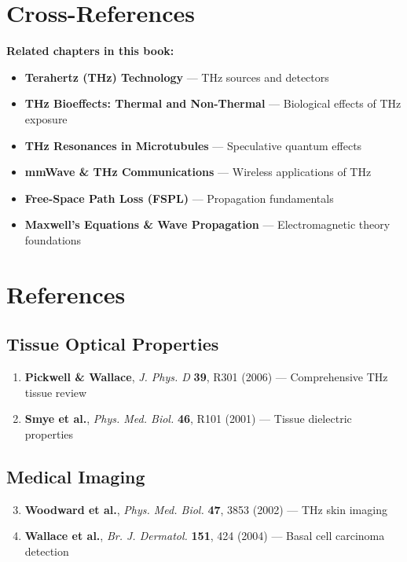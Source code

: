 \section{Cross-References}
\label{sec:cross-references}

\textbf{Related chapters in this book:}
\begin{itemize}
\item \textbf{Terahertz (THz) Technology} --- THz sources and detectors
\item \textbf{THz Bioeffects: Thermal and Non-Thermal} --- Biological effects of THz exposure
\item \textbf{THz Resonances in Microtubules} --- Speculative quantum effects
\item \textbf{mmWave \& THz Communications} --- Wireless applications of THz
\item \textbf{Free-Space Path Loss (FSPL)} --- Propagation fundamentals
\item \textbf{Maxwell's Equations \& Wave Propagation} --- Electromagnetic theory foundations
\end{itemize}

\section{References}
\label{sec:references}

\subsection*{Tissue Optical Properties}

\begin{enumerate}
\item \textbf{Pickwell \& Wallace}, \emph{J. Phys. D} \textbf{39}, R301 (2006) --- Comprehensive THz tissue review
\item \textbf{Smye et al.}, \emph{Phys. Med. Biol.} \textbf{46}, R101 (2001) --- Tissue dielectric properties
\end{enumerate}

\subsection*{Medical Imaging}

\begin{enumerate}
\setcounter{enumi}{2}
\item \textbf{Woodward et al.}, \emph{Phys. Med. Biol.} \textbf{47}, 3853 (2002) --- THz skin imaging
\item \textbf{Wallace et al.}, \emph{Br. J. Dermatol.} \textbf{151}, 424 (2004) --- Basal cell carcinoma detection
\end{enumerate}

